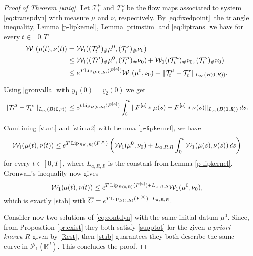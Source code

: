 \documentclass[A4paper,11pt]{article}
\theoremstyle{definition}
\newcommand{\Lip}{\textup{Lip}}
\newcommand{\R}{\mathbb{R}}
\newcommand{\W}{\mathcal{W}}
\newcommand{\PP}{\mathcal{P}_1}
\newcommand{\Fun}[1]{F^{[#1]}}
\begin{document}
\begin{proof}[Proof of Theorem \ref{uniq}]
Let  ${\mathcal T}^\mu_t$ and ${\mathcal T}^\nu_t$ be the flow maps associated to system \eqref{eq:transpdyn} with measure $\mu$ and $\nu$, respectively.
By \eqref{eq:fixedpoint}, the triangle inequality, Lemma \ref{p-lipkernel}, Lemma \ref{primstim} and \eqref{eq:liptrans} we have for every $t \in [0,T]$
\begin{align}
\begin{split}\label{start}
\W_1(\mu(t), \nu(t))&=\W_1(({\mathcal T}^\mu_t)_{\#} \mu^0, ({\mathcal T}^\nu_t)_{\#} \nu_0)  \\
&\le \W_1(({\mathcal T}^\mu_t)_{\#} \mu^0, ({\mathcal T}^\mu_t)_{\#} \nu_0) + \W_1(({\mathcal T}^\mu_t)_{\#} \nu_0, ({\mathcal T}^\nu_t)_{\#} \nu_0)\\
&\le e^{T \, \Lip_{B(0,R)}(\Fun{a})} \W_1(\mu^0, \nu_0)+\|{\mathcal T}^\mu_t-{\mathcal T}^\nu_t\|_{L_\infty(B(0,R))}.
\end{split}
\end{align}

Using \eqref{gronvalla} with $y_1(0)= y_2(0)$ we get
\begin{equation}\label{stima2}
\|{\mathcal T}^\mu_t-{\mathcal T}^\nu_t\|_{L_\infty(B(0,r))}\le e^{t \, \Lip_{B(0,R)}(\Fun{a})}\int_0^t \|\Fun{a}* \mu(s)-\Fun{a}* \nu(s)\|_{L_\infty(B(0,R))}\,ds.
\end{equation}

Combining \eqref{start} and \eqref{stima2} with Lemma \ref{p-lipkernel}, we have
$$
\W_1(\mu(t), \nu(t))\le e^{T \, \Lip_{B(0,R)}(\Fun{a})} \left(\W_1(\mu^0, \nu_0)+ L_{a,R,R}\int_0^t \W_1(\mu(s), \nu(s)) \,ds\right)
$$
for every $t \in [0, T]$, where $L_{a,R,R}$ is the constant from Lemma \ref{p-lipkernel}. Gronwall's inequality now gives
$$
\W_1(\mu(t), \nu(t))\le e^{T \, \Lip_{B(0,R)}(\Fun{a}) + L_{a,R,R}} \W_1(\mu^0, \nu_0),
$$
which is exactly \eqref{stab} with $\overline{C}= e^{T \, \Lip_{B(0,R)}(\Fun{a}) + L_{a,R,R}}$.

Consider now two solutions of \eqref{eq:contdyn} with the same initial datum $\mu^0$. Since, from Proposition \ref{pr:exist} they both satisfy \eqref{supptot} for the given \textit{a priori known} $R$ given by \eqref{Rest}, then \eqref{stab} guarantees they both describe the same curve in $\PP(\R^d)$. This concludes the proof.
\end{proof}


	
\end{document}
